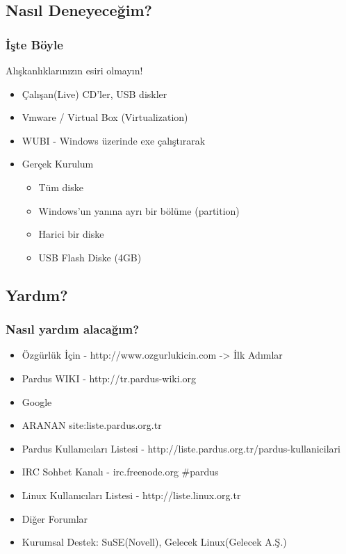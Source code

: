 \documentclass{beamer}
\begin{document}
	\subsection{Nasıl Deneyeceğim?}
	\begin{frame}
		\frametitle{İşte Böyle}
			Alışkanlıklarınızın esiri olmayın!
			\begin{itemize}[<+->]
			\item Çalışan(Live) CD'ler, USB diskler
			\item Vmware / Virtual Box (Virtualization)
			\item WUBI - Windows üzerinde exe çalıştırarak
			\item Gerçek Kurulum
			\begin{itemize}
 				\item Tüm diske
				\item Windows'un yanına ayrı bir bölüme (partition)
				\item Harici bir diske
				\item USB Flash Diske (4GB)
			\end{itemize}

			\end{itemize}
	\end{frame}

	\subsection {Yardım?}
	\begin{frame}
		\frametitle{Nasıl yardım alacağım?}
		\begin{itemize}[<+->]
		 \item Özgürlük İçin - http://www.ozgurlukicin.com -> İlk Adımlar 
		 \item Pardus WIKI - http://tr.pardus-wiki.org 		 
		 \item \color{brown}Google
		 \item \color{brown}ARANAN site:liste.pardus.org.tr
		 \item Pardus Kullanıcıları Listesi - http://liste.pardus.org.tr/pardus-kullanicilari
		 \item IRC Sohbet Kanalı - irc.freenode.org \#pardus
		 \item \color{black}Linux Kullanıcıları Listesi - http://liste.linux.org.tr
		 \item Diğer Forumlar
		 \item Kurumsal Destek: SuSE(Novell), Gelecek Linux(Gelecek A.Ş.)
			 
		\end{itemize}

	\end{frame}
	
\end{document}
